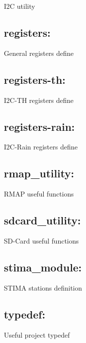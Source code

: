I2C utility\hypertarget{index_registers}{}\subsection{registers\+:}\label{index_registers}
General register\textquotesingle{}s define\hypertarget{index_registers-th}{}\subsection{registers-\/th\+:}\label{index_registers-th}
I2\+C-\/\+TH register\textquotesingle{}s define\hypertarget{index_registers-rain}{}\subsection{registers-\/rain\+:}\label{index_registers-rain}
I2\+C-\/\+Rain register\textquotesingle{}s define\hypertarget{index_rmap_utility}{}\subsection{rmap\+\_\+utility\+:}\label{index_rmap_utility}
R\+M\+AP useful functions\hypertarget{index_sdcard_utility}{}\subsection{sdcard\+\_\+utility\+:}\label{index_sdcard_utility}
S\+D-\/\+Card useful functions\hypertarget{index_stima_module}{}\subsection{stima\+\_\+module\+:}\label{index_stima_module}
S\+T\+I\+MA station\textquotesingle{}s definition\hypertarget{index_typedef}{}\subsection{typedef\+:}\label{index_typedef}
Useful project typedef 